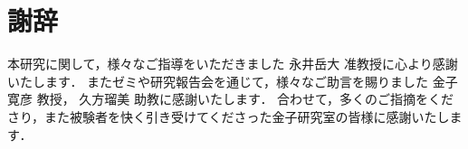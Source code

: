 \chapter*{謝辞}

    本研究に関して，様々なご指導をいただきました 永井岳大 准教授に心より感謝いたします．
    またゼミや研究報告会を通じて，様々なご助言を賜りました 金子寛彦 教授， 久方瑠美 助教に感謝いたします．
    合わせて，多くのご指摘をくださり，また被験者を快く引き受けてくださった金子研究室の皆様に感謝いたします．